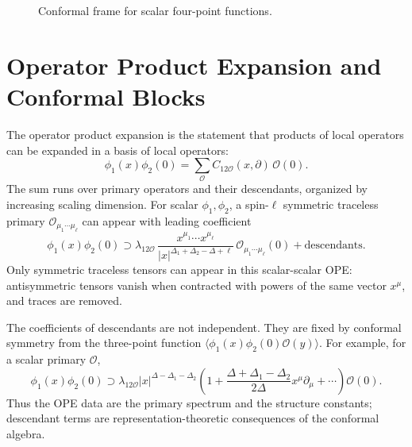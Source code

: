 \begin{figure}[htbp]
\centering
{}
\caption{Conformal frame for scalar four-point functions.}
\end{figure}

\section{Operator Product Expansion and Conformal Blocks}

The operator product expansion is the statement that products of local
operators can be expanded in a basis of local operators:
\[
  \phi_1(x)\phi_2(0)
  =
  \sum_{\mathcal O}
  C_{12\mathcal O}(x,\partial)\,\mathcal O(0).
\]
The sum runs over primary operators and their descendants, organized by
increasing scaling dimension.
For scalar \(\phi_1,\phi_2\), a spin-\(\ell\) symmetric traceless
primary \(\mathcal O_{\mu_1\cdots\mu_\ell}\) can appear with leading
coefficient
\[
  \phi_1(x)\phi_2(0)
  \supset
  \lambda_{12\mathcal O}\,
  \frac{x^{\mu_1}\cdots x^{\mu_\ell}}
       {|x|^{\Delta_1+\Delta_2-\Delta+\ell}}\,
  \mathcal O_{\mu_1\cdots\mu_\ell}(0)
  +\text{descendants}.
\]
Only symmetric traceless tensors can appear in this scalar-scalar OPE:
antisymmetric tensors vanish when contracted with powers of the same
vector \(x^\mu\), and traces are removed.

The coefficients of descendants are not independent.  They are fixed by
conformal symmetry from the three-point function
\(\langle\phi_1(x)\phi_2(0)\mathcal O(y)\rangle\).  For example, for a
scalar primary \(\mathcal O\),
\[
  \phi_1(x)\phi_2(0)
  \supset
  \lambda_{12\mathcal O}
  |x|^{\Delta-\Delta_1-\Delta_2}
  \left(
    1+
    \frac{\Delta+\Delta_1-\Delta_2}{2\Delta}
    x^\mu\partial_\mu+\cdots
  \right)\mathcal O(0).
\]
Thus the OPE data are the primary spectrum and the structure constants;
descendant terms are representation-theoretic consequences of the
conformal algebra.

